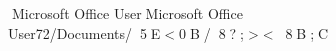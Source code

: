 Microsoft Office User                                 M i c r o s o f t   O f f i c e   U s e r   7 2 / D o c u m e n t s / 5E<0B/ 8?;><8B;C